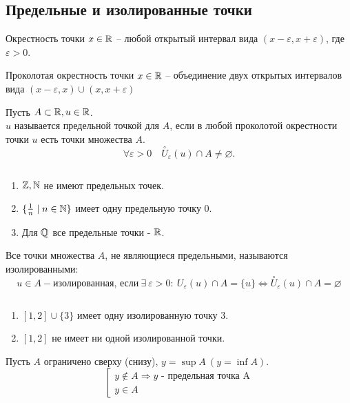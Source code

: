 \documentclass[12pt]{report}
\begin{document}
\subsection{Предельные и изолированные точки}\label{ques_9}
\begin{defn}
    Окрестность точки $x \in \mathbb{R}$ -- любой открытый интервал вида $(x-\varepsilon , x+\varepsilon )$, где $\varepsilon >0$.
\end{defn}
\begin{defn}
    Проколотая окрестность точки $x \in \mathbb{R}$ -- объединение двух открытых интервалов вида $(x-\varepsilon , x) \cup (x, x+\varepsilon )$
\end{defn}
\begin{defn}
    Пусть $A \subset \mathbb{R}, u \in \mathbb{R}$.\\
    $u $ называется предельной точкой для $A$, если в любой проколотой окрестности точки  $u$ есть точки множества $A$.
    \[
	\forall \varepsilon > 0 \quad \stackrel{{\circ}} U_{\varepsilon }(u) \cap A \ne \varnothing
    .\] 
\end{defn}
\begin{exs}$ $
    \begin{enumerate}
        \item $\mathbb{Z}, \mathbb{N} $ не имеют предельных точек.
	\item $\{\frac{1}{n}\mid n \in \mathbb{N}\}$ имеет одну предельную точку 0.
	\item Для $\mathbb{Q}$ все предельные точки - $\mathbb{R}$.
    \end{enumerate}
\end{exs}
\begin{defn}
    Все точки множества $A$, не являющиеся предельными, называются изолированными:
    $$u \in A - \mbox{изолированная, если} ~\exists ~\varepsilon > 0 : ~U_\varepsilon (u) \cap A = \{u\} \Leftrightarrow \stackrel{\circ} U_\varepsilon (u) \cap A = \varnothing$$ 
\end{defn}
\begin{exs}$ $
    \begin{enumerate}
	\item $[1, 2] \cup \{3\}$ имеет одну изолированную точку $3$.
	\item $[1, 2]$ не имеет ни одной изолированной точки.
    \end{enumerate}
\end{exs}
\begin{lm}
      Пусть  $A$  ограничено сверху (снизу),  $y = \sup{A} ~(y = \inf{A})$.
      $$
      \left [ 
      \begin{array}{l}
      y \notin A \Rightarrow \mbox{$y$ - предельная точка  A}\\
	y \in A
      \end{array}
      \right .
      $$
\end{lm}
\end{document}
